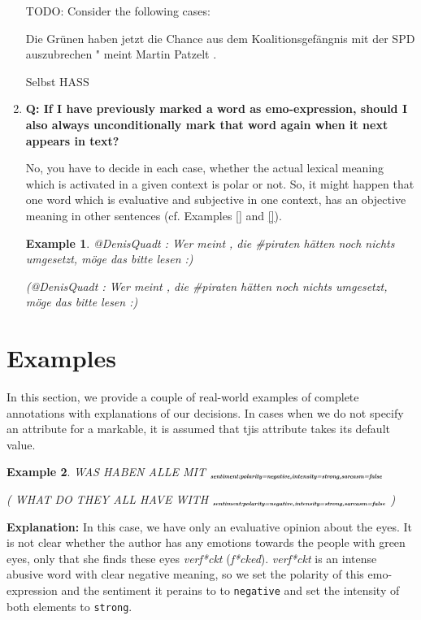 \documentclass[11pt,a4paper]{article}
\theoremstyle{mytheoremstyle}
\newtheorem{exmp}{Example}[section]
\newcommand{\mtag}[2]{{\upshape[\emph{#2}\upshape]$_{\textrm{\bfseries\emph{\tiny
        #1}}}$}}
\newcommand{\sentiment}[2][]{\mtag{sen\-ti\-ment\ifstrempty{#1}{}{:#1}}{#2}}
\newcommand{\target}[2][]{\mtag{tar\-get\ifstrempty{#1}{}{:#1}}{#2}}
\newcommand{\emoexpression}[2][]{\mtag{emo-\-ex\-pression\ifstrempty{#1}{}{:#1}}{#2}}
\begin{document}
\begin{enumerate}
TODO: Consider the following cases:

Die Gr\"unen haben jetzt die Chance aus dem Koalitionsgef\"angnis mit
der SPD auszubrechen " meint Martin Patzelt .

Selbst HASS

\item\textbf{Q: If I have previously marked a word as emo-expression,
  should I also always unconditionally mark that word again when it
  next appears in text?}

No, you have to decide in each case, whether the actual lexical
meaning which is activated in a given context is polar or not.  So, it
might happen that one word which is evaluative and subjective in one
context, has an objective meaning in other sentences (cf. Examples
\ref{} and \ref{}).

\begin{exmp}
  @DenisQuadt : Wer meint , die \#piraten h\"atten noch nichts
  umgesetzt, m\"oge das bitte lesen :)

{\footnotesize(@DenisQuadt : Wer meint , die \#piraten h\"atten noch
  nichts umgesetzt, m\"oge das bitte lesen :)}\label{exmp:no-emoexpr}
\end{exmp}



\end{enumerate}

\section{Examples}\label{sec:examples}

In this section, we provide a couple of real-world examples of
complete annotations with explanations of our decisions.  In cases
when we do not specify an attribute for a markable, it is assumed that
tjis attribute takes its default value.

\begin{exmp}
  \footnotesize WAS HABEN ALLE MIT
  \sentiment[polarity=negative,intensity=strong,sarcasm=false]{IHREN
    \emoexpression[polarity=negative,intensity=strong,sarcasm=false]{VERF*CKTEN}
    \target{GR\"UNEN AUGEN}}

  {\scriptsize( WHAT DO THEY ALL HAVE WITH
    \sentiment[polarity=negative,intensity=strong,sarcasm=false]{THEIR
      \emoexpression[polarity=negative,intensity=strong,sarcasm=false]{F*CKED}
      \target{GREEN EYES}} )}\label{exmp:sarcasm}
\end{exmp}

\textbf{Explanation:} In this case, we have only an evaluative opinion
about the eyes.  It is not clear whether the author has any emotions
towards the people with green eyes, only that she finds these eyes
\textit{verf*ckt} (\textit{f*cked}).  \textit{verf*ckt} is an intense
abusive word with clear negative meaning, so we set the polarity of
this emo-expression and the sentiment it perains to to
\texttt{negative} and set the intensity of both elements to
\texttt{strong}.
\end{document}
